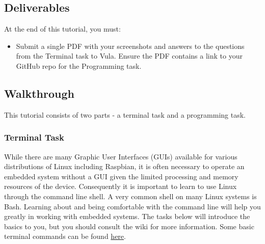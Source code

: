 \subsection{Deliverables}
At the end of this tutorial, you must:
\begin{itemize}
    \item Submit a single PDF with your screenshots and answers to the questions from the Terminal task to Vula. Ensure the PDF contains a link to your GitHub repo for the Programming task. 
\end{itemize}

\subsection{Walkthrough}
This tutorial consists of two parts - a terminal task and a programming task. 

\subsubsection{Terminal Task}
\label{sec:Prac1:Terminal}
While there are many Graphic User Interfaces (GUIs) available for various distributions of Linux including Raspbian, it is often necessary to operate an embedded system without a GUI given the limited processing and memory resources of the device.  Consequently it is important to learn to use Linux through the command line shell. A very common shell on many Linux systems is Bash.  Learning about and being comfortable with the command line will help you greatly in working with embedded systems.  The tasks below will introduce the basics to you, but you should consult the wiki for more information. Some basic terminal commands can be found \href{http://wiki.ee.uct.ac.za/Unix_Shell_(Terminal)}{here}.

